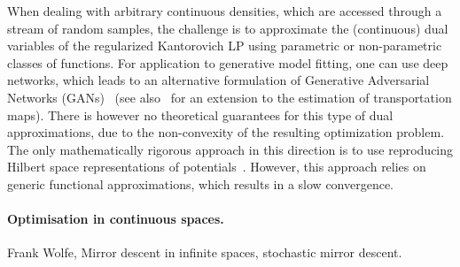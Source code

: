 When dealing with arbitrary continuous densities, which are accessed through a
stream of random samples, the challenge is to approximate  the (continuous) dual
variables of the regularized Kantorovich LP using parametric or non-parametric classes of functions. For application to
generative model fitting, one can use deep networks, which leads to an alternative
formulation of Generative Adversarial Networks (GANs)~\cite{arjovsky2017wgan}
(see also~\citet{seguy2018large} for an extension to the estimation of
transportation maps). There is however no theoretical guarantees for this type
of dual approximations, due to the non-convexity of the resulting optimization
problem. The only mathematically rigorous approach in this direction is to use
reproducing Hilbert space representations of
potentials~\cite{2016-genevay-nips}. However, this approach relies on generic functional
approximations, which results in a slow convergence.

\paragraph{Optimisation in continuous spaces.} Frank Wolfe, Mirror descent in infinite spaces, stochastic mirror descent.